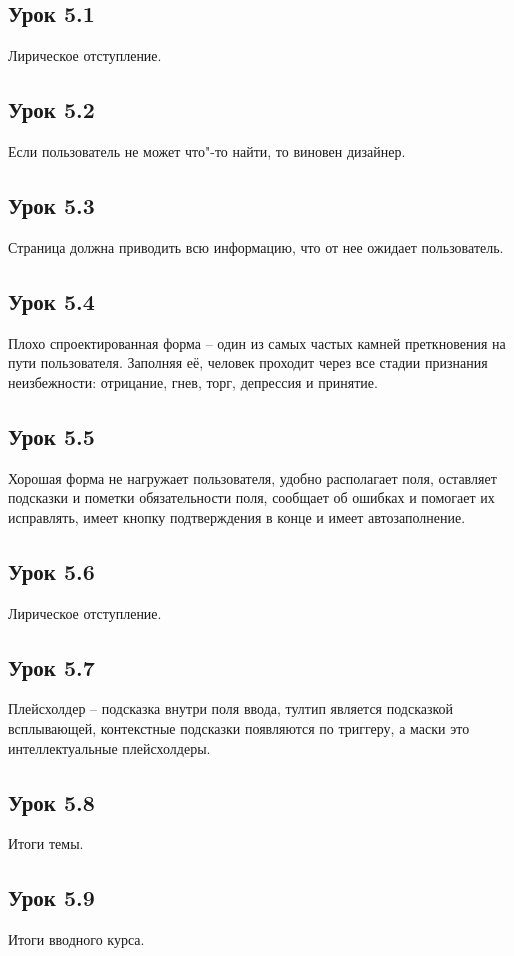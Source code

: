 \documentclass[variant=practice]{bsuir}
\begin{document}
\subsection{Урок 5.1} Лирическое отступление.

\subsection{Урок 5.2} Если пользователь не может что"-то найти, то виновен
дизайнер.

\subsection{Урок 5.3} Страница должна приводить всю информацию, что от нее
ожидает пользователь.

\subsection{Урок 5.4} Плохо спроектированная форма -- один из самых частых
камней преткновения на пути пользователя. Заполняя её, человек проходит через
все стадии признания неизбежности: отрицание, гнев, торг, депрессия и принятие.

\subsection{Урок 5.5} Хорошая форма не нагружает пользователя, удобно
располагает поля, оставляет подсказки и пометки обязательности поля, сообщает об
ошибках и помогает их исправлять, имеет кнопку подтверждения в конце и имеет
автозаполнение.

\subsection{Урок 5.6} Лирическое отступление.

\subsection{Урок 5.7} Плейсхолдер -- подсказка внутри поля ввода, тултип
является подсказкой всплывающей, контекстные подсказки появляются по триггеру, а
маски это интеллектуальные плейсхолдеры.

\subsection{Урок 5.8} Итоги темы.

\subsection{Урок 5.9} Итоги вводного курса.
\end{document}
